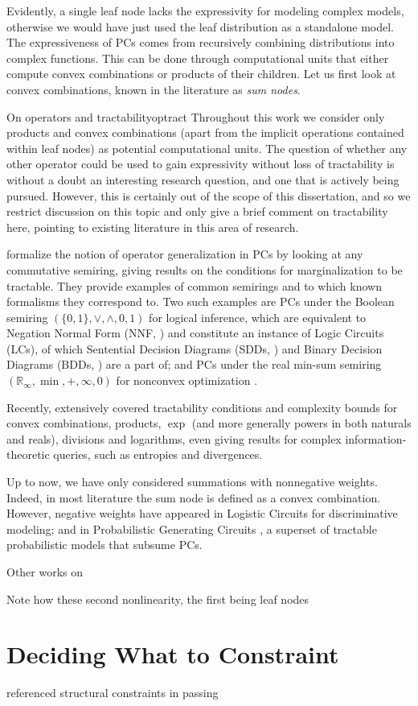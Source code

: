 Evidently, a single leaf node lacks the expressivity for modeling complex models, otherwise we
would have just used the leaf distribution as a standalone model. The expressiveness of PCs comes
from recursively combining distributions into complex functions. This can be done through
computational units that either compute convex combinations or products of their children. Let us
first look at convex combinations, known in the literature as \emph{sum nodes}.

\begin{remark}[breakable]{On operators and tractability}{optract}
  Throughout this work we consider only products and convex combinations (apart from the implicit
  operations contained within leaf nodes) as potential computational units. The question of whether
  any other operator could be used to gain expressivity without loss of tractability is without a
  doubt an interesting research question, and one that is actively being pursued. However, this is
  certainly out of the scope of this dissertation, and so we restrict discussion on this topic and
  only give a brief comment on tractability here, pointing to existing literature in this area of
  research.

  \citet{friesen16} formalize the notion of operator generalization in PCs by looking at any
  commutative semiring, giving results on the conditions for marginalization to be tractable. They
  provide examples of common semirings and to which known formalisms they correspond to. Two such
  examples are PCs under the Boolean semiring $(\{0,1\},\vee,\wedge,0,1)$ for logical inference,
  which are equivalent to Negation Normal Form (NNF, \cite{barwise82}) and constitute an instance
  of Logic Circuits (LCs), of which Sentential Decision Diagrams (SDDs, \cite{darwiche11}) and
  Binary Decision Diagrams (BDDs, \cite{akers78}) are a part of; and PCs under the real min-sum
  semiring $(\mathbb{R}_{\infty}, \min,+,\infty,0)$ for nonconvex optimization \citep{friesen15}.

  Recently, \citet{vergari21} extensively covered tractability conditions and complexity bounds for
  convex combinations, products, $\exp$ (and more generally powers in both naturals and reals),
  divisions and logarithms, even giving results for complex information-theoretic queries, such as
  entropies and divergences.

  Up to now, we have only considered summations with nonnegative weights. Indeed, in most
  literature the sum node is defined as a convex combination. However, negative weights have
  appeared in Logistic Circuits \citep{liang19} for discriminative modeling; and in Probabilistic
  Generating Circuits \citep{zhang21}, a superset of tractable probabilistic models that subsume
  PCs.

  Other works on 
\end{remark}


Note how these second nonlinearity, the first being leaf nodes

\section{Deciding What to Constraint}
\label{sec:const}


referenced structural constraints in passing

